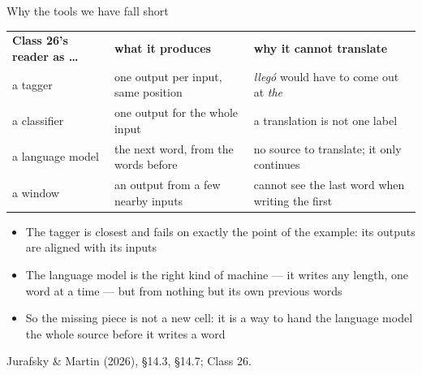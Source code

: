 \documentclass[aspectratio=169, 11pt]{beamer}
\newcommand{\srcline}[1]{%
  \par\vspace{0.25em}%
  {\scriptsize\color{mcMuted}\hfill #1\par}}
\begin{document}
\begin{frame}{Why the tools we have fall short}
  \vspace{-0.1em}
  {\scriptsize
  \renewcommand{\arraystretch}{1.3}
  \begin{tabular}{@{}l@{\hspace{1.0em}}l@{\hspace{1.0em}}l@{}}
    \textbf{Class 26's reader as \ldots} & \textbf{what it produces} & \textbf{why it cannot translate}\\
    a tagger & one output per input, same position & \emph{lleg\'o} would have to come out at \emph{the}\\
    a classifier & one output for the whole input & a translation is not one label\\
    a language model & the next word, from the words before & no source to translate; it only continues\\
    a window & an output from a few nearby inputs & cannot see the last word when writing the first\\
  \end{tabular}}
  \vspace{0.4em}

  {\footnotesize
  \begin{itemize}\itemsep0.2em
    \item The tagger is closest and fails on exactly the point of the
          example: its outputs are \alert{aligned} with its inputs
    \item The language model is the right kind of machine --- it
          \alert{writes} any length, one word at a time --- but from nothing
          but its own previous words
    \item So the missing piece is not a new cell: it is a way to hand the
          language model \alert{the whole source} before it writes a word
  \end{itemize}}
  \srcline{Jurafsky \& Martin (2026), \S14.3, \S14.7; Class 26.}
\end{frame}
\end{document}
